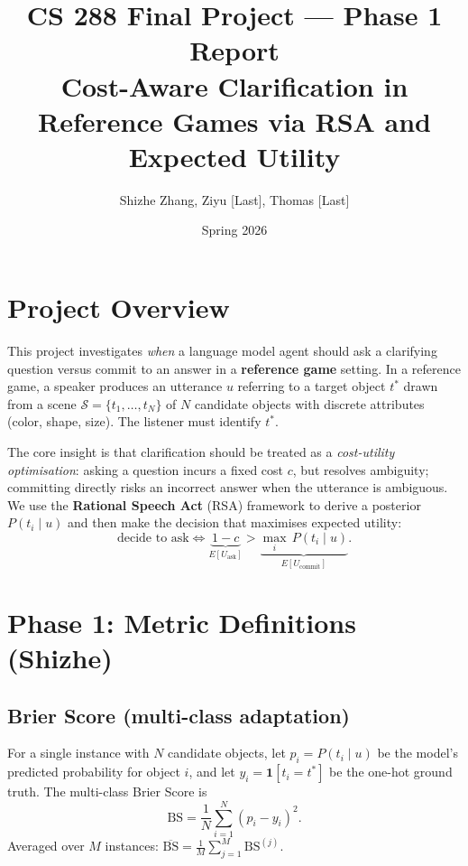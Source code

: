 \documentclass[11pt]{article}
\title{\textbf{CS 288 Final Project --- Phase 1 Report}\\
\large Cost-Aware Clarification in Reference Games via RSA and Expected Utility}
\author{Shizhe Zhang, Ziyu [Last], Thomas [Last]}
\date{Spring 2026}
\begin{document}
\maketitle

\section{Project Overview}

This project investigates \emph{when} a language model agent should ask a clarifying
question versus commit to an answer in a \textbf{reference game} setting.  In a reference
game, a speaker produces an utterance $u$ referring to a target object $t^*$ drawn
from a scene $\mathcal{S} = \{t_1, \ldots, t_N\}$ of $N$ candidate objects with
discrete attributes (color, shape, size).  The listener must identify $t^*$.

The core insight is that clarification should be treated as a
\emph{cost-utility optimisation}: asking a question incurs a fixed cost $c$, but
resolves ambiguity; committing directly risks an incorrect answer when the utterance
is ambiguous.  We use the \textbf{Rational Speech Act} (RSA) framework to derive a
posterior $P(t_i \mid u)$ and then make the decision that maximises expected utility:
\begin{equation}
    \text{decide to ask} \iff
    \underbrace{1 - c}_{E[U_{\text{ask}}]} >
    \underbrace{\max_i\, P(t_i \mid u)}_{E[U_{\text{commit}}]}.
\end{equation}

\section{Phase 1: Metric Definitions (Shizhe)}

\subsection{Brier Score (multi-class adaptation)}

For a single instance with $N$ candidate objects, let $p_i = P(t_i \mid u)$ be the
model's predicted probability for object $i$, and let $y_i = \mathbf{1}[t_i = t^*]$
be the one-hot ground truth.  The multi-class Brier Score is
\begin{equation}
    \mathrm{BS} = \frac{1}{N}\sum_{i=1}^{N}(p_i - y_i)^2.
\end{equation}
Averaged over $M$ instances: $\overline{\mathrm{BS}} = \frac{1}{M}\sum_{j=1}^{M}\mathrm{BS}^{(j)}$.
\end{document}
